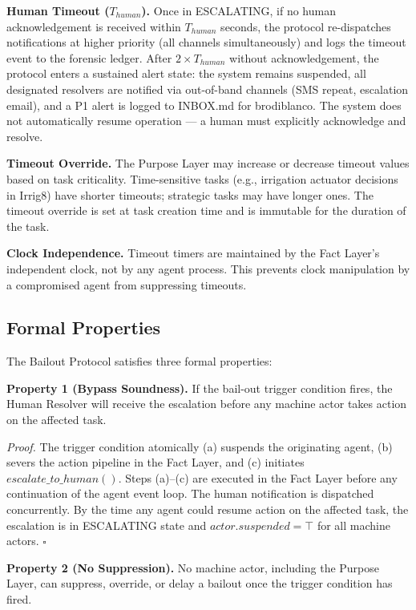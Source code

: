 \medskip\noindent\textbf{Human Timeout ($T_{human}$).} Once in ESCALATING, if no human acknowledgement is received within $T_{human}$ seconds, the protocol re-dispatches notifications at higher priority (all channels simultaneously) and logs the timeout event to the forensic ledger. After $2 \times T_{human}$ without acknowledgement, the protocol enters a sustained alert state: the system remains suspended, all designated resolvers are notified via out-of-band channels (SMS repeat, escalation email), and a P1 alert is logged to INBOX.md for brodiblanco. The system does not automatically resume operation --- a human must explicitly acknowledge and resolve.

\medskip\noindent\textbf{Timeout Override.} The Purpose Layer may increase or decrease timeout values based on task criticality. Time-sensitive tasks (e.g., irrigation actuator decisions in Irrig8) have shorter timeouts; strategic tasks may have longer ones. The timeout override is set at task creation time and is immutable for the duration of the task.

\medskip\noindent\textbf{Clock Independence.} Timeout timers are maintained by the Fact Layer's independent clock, not by any agent process. This prevents clock manipulation by a compromised agent from suppressing timeouts.

\subsection{Formal Properties}
\label{sec:properties}

The Bailout Protocol satisfies three formal properties:

\medskip\noindent\textbf{Property 1 (Bypass Soundness).} If the bail-out trigger condition fires, the Human Resolver will receive the escalation before any machine actor takes action on the affected task.

\textit{Proof.} The trigger condition atomically (a) suspends the originating agent, (b) severs the action pipeline in the Fact Layer, and (c) initiates $escalate\_to\_human()$. Steps (a)--(c) are executed in the Fact Layer before any continuation of the agent event loop. The human notification is dispatched concurrently. By the time any agent could resume action on the affected task, the escalation is in ESCALATING state and $actor.suspended = \top$ for all machine actors. $\square$

\medskip\noindent\textbf{Property 2 (No Suppression).} No machine actor, including the Purpose Layer, can suppress, override, or delay a bailout once the trigger condition has fired.

